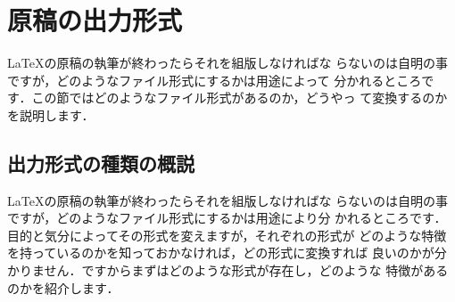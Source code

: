 \section{原稿の出力形式}
%
{\LaTeX}の原稿の執筆が終わったらそれを組版しなければな
らないのは自明の事ですが，どのようなファイル形式にするかは用途によって
分かれるところです．この節ではどのようなファイル形式があるのか，どうやっ
て変換するのかを説明します．

\subsection{出力形式の種類の概説}

{\LaTeX}の原稿の執筆が終わったらそれを組版しなければな
らないのは自明の事ですが，どのようなファイル形式にするかは用途により分
かれるところです．目的と気分によってその形式を変えますが，それぞれの形式が
どのような特徴を持っているのかを知っておかなければ，どの形式に変換すれば
良いのかが分かりません．ですからまずはどのような形式が存在し，どのような
特徴があるのかを紹介します．

